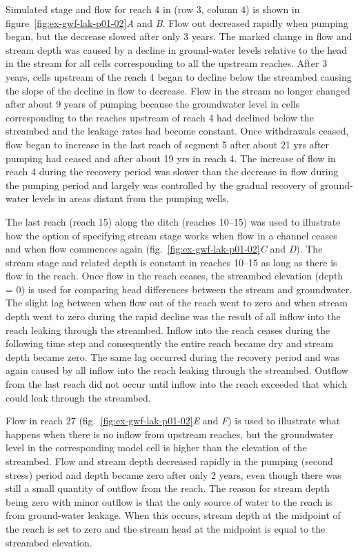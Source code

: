 Simulated stage and flow for reach 4 in (row 3, column 4) is shown in figure~\ref{fig:ex-gwf-lak-p01-02}\textit{A} and \textit{B}. Flow out decreased rapidly when pumping began, but the decrease slowed after only 3 years. The marked change in flow and stream depth was caused by a decline in ground-water levels relative to the head in the stream for all cells corresponding to all the upstream reaches. After 3 years, cells upstream of the reach 4 began to decline below the streambed causing the slope of the decline in flow to decrease. Flow in the stream no longer changed after about 9 years of pumping because the groundwater level in cells corresponding to the reaches upstream of reach 4 had declined below the streambed and the leakage rates had become constant. Once withdrawals ceased, flow began to increase in the last reach of segment 5 after about 21 yrs after pumping had ceased and after about 19 yrs in reach 4. The increase of flow in reach 4 during the recovery period was slower than the decrease in flow during the pumping period and largely was controlled by the gradual recovery of ground-water levels in areas distant from the pumping wells.

The last reach (reach 15) along the ditch (reaches 10--15) was used to illustrate how the option of specifying stream stage works when flow in a channel ceases and when flow commences again (fig.~\ref{fig:ex-gwf-lak-p01-02}\textit{C} and \textit{D}). The stream stage and related depth is constant in reaches 10--15 as long as there is flow in the reach. Once flow in the reach ceases, the streambed elevation (depth = 0) is used for comparing head differences between the stream and groundwater. The slight lag between when flow out of the reach went to zero and when stream depth went to zero during the rapid decline was the result of all inflow into the reach leaking through the streambed. Inflow into the reach ceases during the following time step and consequently the entire reach became dry and stream depth became zero. The same lag occurred during the recovery period and was again caused by all inflow into the reach leaking through the streambed. Outflow from the last reach did not occur until inflow into the reach exceeded that which could leak through the streambed.

Flow in reach 27 (fig.~\ref{fig:ex-gwf-lak-p01-02}\textit{E} and \textit{F}) is used to illustrate what happens when there is no inflow from upstream reaches, but the groundwater level in the corresponding model cell is higher than the elevation of the streambed. Flow
and stream depth decreased rapidly in the pumping (second stress) period and depth became zero after only 2 years, even though there was still a small quantity of outflow from the reach. The reason for stream depth being zero with minor outflow is that the only source of water to the reach is from ground-water leakage. When this occurs, stream depth at the midpoint of the reach
is set to zero and the stream head at the midpoint is equal to the streambed elevation.

